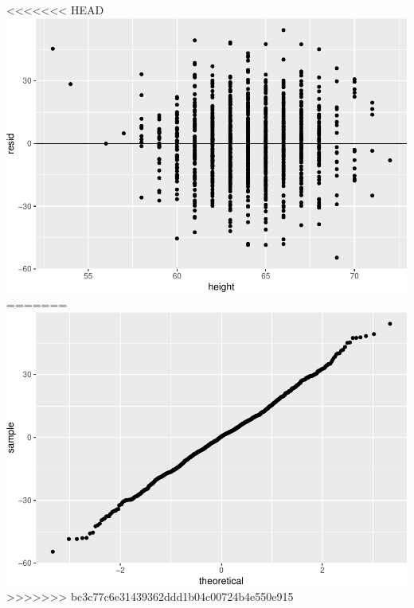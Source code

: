 \documentclass[]{article}
\newenvironment{Shaded}{\begin{snugshade}}{\end{snugshade}}
\newcommand{\DataTypeTok}[1]{\textcolor[rgb]{0.13,0.29,0.53}{#1}}
\newcommand{\DecValTok}[1]{\textcolor[rgb]{0.00,0.00,0.81}{#1}}
\newcommand{\KeywordTok}[1]{\textcolor[rgb]{0.13,0.29,0.53}{\textbf{#1}}}
\newcommand{\NormalTok}[1]{#1}
\newcommand{\OperatorTok}[1]{\textcolor[rgb]{0.81,0.36,0.00}{\textbf{#1}}}
\newcommand{\StringTok}[1]{\textcolor[rgb]{0.31,0.60,0.02}{#1}}
\begin{document}
<<<<<<< HEAD
\includegraphics{lab-8-regression_files/figure-latex/unnamed-chunk-17-1.pdf}
=======
\includegraphics{lab-8-regression_files/figure-latex/unnamed-chunk-18-1.pdf}
>>>>>>> bc3c77c6e31439362ddd1b04c00724b4e550e915

\begin{Shaded}
\end{Shaded}
\end{document}
